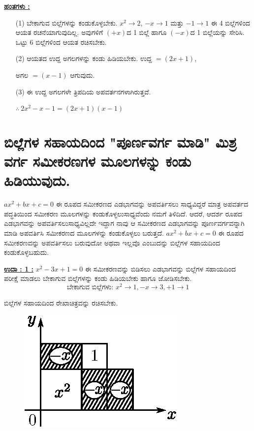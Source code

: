 \noindent
{\textbf{\underline{ಹಂತಗಳು :}}}
\begin{itemize}
\item [(1)] ಬೇಕಾಗುವ ಬಿಲ್ಲೆಗಳನ್ನು ಕಂಡುಕೊಳ್ಳಬೇಕು. $x^2 \rightarrow 2$, $-x \rightarrow 1$ ಮತ್ತು $-1 \rightarrow 1$ ಈ 4 ಬಿಲ್ಲೆಗಳಿಂದ ಆಯತ ರಚನೆಯಾಗುವುದಿಲ್ಲ. ಅವುಗಳಿಗೆ $(+x)$ದ 1 ಬಿಲ್ಲೆ ಹಾಗೂ $(-x)$ದ 1 ಬಿಲ್ಲೆಯನ್ನು ಸೇರಿಸಿ. ಒಟ್ಟು 6 ಬಿಲ್ಲೆಗಳಿಂದ ಆಯತ ರಚಿಸಬೇಕು. 
\item [(2)] ಆಯತದ ಉದ್ದ ಅಗಲಗಳನ್ನು ಕಂಡು ಹಿಡಿಯಬೇಕು. ಉದ್ದ $= (2x + 1)$, 

ಅಗಲ $= (x - 1)$ ಆಗುವುದು. 

\item [(3)] ಈ ಉದ್ದ ಅಗಲಗಳೇ ತ್ರಿಪದಿಯ ಅಪವರ್ತನಗಳಾಗಿರುತ್ತವೆ. 

$\therefore~ 2x^2 - x - 1 = (2x + 1)(x - 1)$
\end{itemize}

\section*{ಬಿಲ್ಲೆಗಳ ಸಹಾಯದಿಂದ "ಪೂರ್ಣವರ್ಗ ಮಾಡಿ" ಮಿಶ್ರ ವರ್ಗ ಸಮೀಕರಣಗಳ ಮೂಲಗಳನ್ನು ಕಂಡು ಹಿಡಿಯುವುದು.}

$ax^2 + bx + c = 0$ ಈ ರೂಪದ ಸಮೀಕರಣದ ಎಡಭಾಗವನ್ನು ಅಪವರ್ತಿಸಲು ಸಾಧ್ಯ\break ವಿದ್ದರೆ ಮಾತ್ರ ಅಪವರ್ತದ ಪದ್ಧತಿಯಿಂದ ಸಮೀಕರಣ ಮೂಲಗಳನ್ನು ಕಂಡುಕೊಳ್ಳಲು\break ಸಾಧ್ಯವೆಂದು ನಮಗೆ ತಿಳಿದಿದೆ. ಆದರೆ, ಆದರ್ಶ ರೂಪದ ಎಡಭಾಗವನ್ನು ಅಪವರ್ತಿಸಲು\break ಸಾಧ್ಯವಿಲ್ಲದೇ ಇದ್ದಾಗ ನಾವು ಆ ಸಮೀಕರಣದ ಎಡಭಾಗವನ್ನು ಪೂರ್ಣವರ್ಗವನ್ನಾಗಿ ಮಾಡಿ ಅಪವರ್ತಿಸಿ ಸಮೀಕರಣದ ಮೂಲಗಳನ್ನು ಕಂಡುಕೊಳ್ಳಲು ಬರುತ್ತದೆ. $ax^2 + bx + c = 0$ ಈ ರೂಪದ ಸಮೀಕರಣವನ್ನು ಅಪವರ್ತಿಸಲು ಬರುವುದೋ ಅಥವಾ ಇಲ್ಲವೊ ಎಂಬುದನ್ನು ಬಿಲ್ಲೆಗಳ ಸಹಾಯದಿಂದ ಕಂಡುಕೊಳ್ಳಬಹುದು. 

\noindent
{\textbf{\underline{ಉದಾ : 1 :}}} $x^2 - 3x + 1 = 0$ ಈ ಸಮೀಕರಣವನ್ನು ಬಿಡಿಸಲು ಎಡಭಾಗವನ್ನು ಬಿಲ್ಲೆಗಳ ಸಹಾಯದಿಂದ ಪರೀಕ್ಷೆ ಮಾಡಲು ಬೇಕಾಗುವ ಬಿಲ್ಲೆಗಳನ್ನು ಕಂಡು ಹಿಡಿಯಬೇಕು ಹಾಗೂ ಜೋಡಿಸಬೇಕು. 
$$
\text{ಬೇಕಾಗುವ ಬಿಲ್ಲೆಗಳು: } x^2 \rightarrow 1, -x \rightarrow 3, +1 \rightarrow 1
$$

ಬಿಲ್ಲೆಗಳ ಸಹಾಯದಿಂದ ರೇಖಾಚಿತ್ರವನ್ನು ರಚಿಸಬೇಕು.
\begin{figure}[H]
\centering
\includegraphics[scale=0.8]{src/figure/chap3/fig3-47.eps}
\end{figure}

